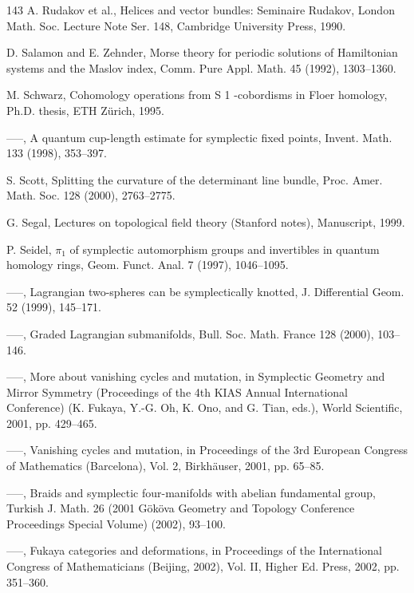 \begin{thebibliography}{143}
 A. Rudakov et al., Helices and vector bundles: Seminaire Rudakov, London Math. Soc. Lecture Note Ser. 148, Cambridge University Press, 1990.

 D. Salamon and E. Zehnder, Morse theory for periodic solutions of Hamiltonian systems and the Maslov index, Comm. Pure Appl. Math. 45 (1992), 1303–1360.

 M. Schwarz, Cohomology operations from S 1 -cobordisms in Floer homology, Ph.D. thesis, ETH Zürich, 1995.

 —–, A quantum cup-length estimate for symplectic fixed points, Invent. Math. 133 (1998), 353–397.

 S. Scott, Splitting the curvature of the determinant line bundle, Proc. Amer. Math. Soc. 128 (2000), 2763–2775.

 G. Segal, Lectures on topological field theory (Stanford notes), Manuscript, 1999.

 P. Seidel, \(\pi_1\) of symplectic automorphism groups and invertibles in quantum homology rings, Geom. Funct. Anal. 7 (1997), 1046–1095.

 —–, Lagrangian two-spheres can be symplectically knotted, J. Differential Geom. 52 (1999), 145–171.

 —–, Graded Lagrangian submanifolds, Bull. Soc. Math. France 128 (2000), 103–146.

 —–, More about vanishing cycles and mutation, in Symplectic Geometry and Mirror Symmetry (Proceedings of the 4th KIAS Annual International Conference) (K. Fukaya, Y.-G. Oh, K. Ono, and G. Tian, eds.), World Scientific, 2001, pp. 429–465.

 —–, Vanishing cycles and mutation, in Proceedings of the 3rd European Congress of Mathematics (Barcelona), Vol. 2, Birkhäuser, 2001, pp. 65–85.

 —–, Braids and symplectic four-manifolds with abelian fundamental group, Turkish J. Math. 26 (2001 Gököva Geometry and Topology Conference Proceedings Special Volume) (2002), 93–100.

 —–, Fukaya categories and deformations, in Proceedings of the International Congress of Mathematicians (Beijing, 2002), Vol. II, Higher Ed. Press, 2002, pp. 351–360.


\end{thebibliography}
